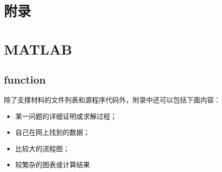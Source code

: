 \newpage
\section*{附录}
\appendix				%
\setcounter{section}{0}	%
\setcounter{table}{0}   %
\setcounter{figure}{0}	%
\setcounter{equation}{0}%
\renewcommand{\thetable}{A\arabic{table}}
\renewcommand{\thefigure}{A\arabic{figure}}
\renewcommand\theequation{A.\arabic{equation}}

\section{MATLAB}
\subsection{function}


%

除了支撑材料的文件列表和源程序代码外，附录中还可以包括下面内容：
\begin{itemize}
	\item 某一问题的详细证明或求解过程；
	\item 自己在网上找到的数据；
	\item 比较大的流程图；
	\item 较繁杂的图表或计算结果
\end{itemize}
	

